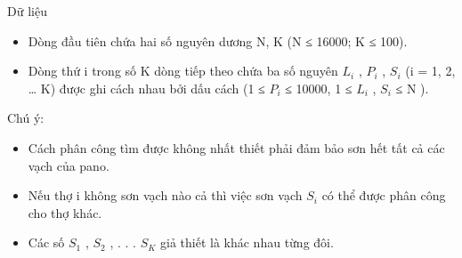 Dữ liệu
\begin{itemize}
	\item     Dòng đầu tiên chứa hai số nguyên dương N, K (N ≤ 16000; K ≤ 100).   
	\item     Dòng thứ i trong số K dòng tiếp theo chứa ba số nguyên  $L_{i}$    , $P_{i}$    , $S_{i}$    (i = 1, 2, … K) được ghi cách nhau bởi dấu cách (1 ≤  $P_{i}$    ≤ 10000, 1 ≤   $L_{i}$    , $S_{i}$    ≤  N ).   
\end{itemize}

   Chú ý:  
\begin{itemize}
	\item     Cách phân công tìm được không nhất thiết phải đảm bảo sơn hết tất cả các vạch của pano.   
	\item     Nếu thợ i không sơn vạch nào cả thì việc sơn vạch $S_{i}$    có thể được phân công cho thợ khác.   
	\item     Các số $S_{1}$    , $S_{2}$    , . . . $S_{K}$    giả thiết là khác nhau từng đôi.   
\end{itemize}